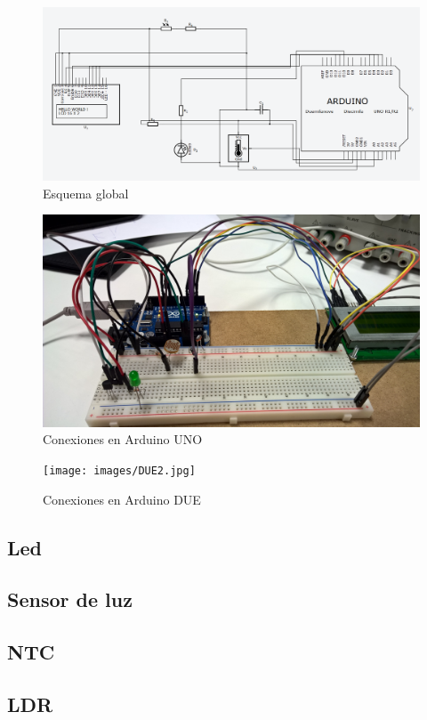 \documentclass[]{article}
\begin{document}
\begin{figure}[H]
	\centering
	\includegraphics[width=0.6\linewidth]{images/squema.PNG}
	\caption{Esquema global}
	\label{fig:squema}
\end{figure}


\begin{figure}[H]
	\centering
	\includegraphics[width=1\linewidth]{images/arduinoUNO.jpg}
	\caption{Conexiones en Arduino UNO}
	\label{fig:uno}
\end{figure}

\begin{figure}[H]
	\centering
	\texttt{[image: images/DUE2.jpg]}
	\caption{Conexiones en Arduino DUE}
	\label{fig:due}
\end{figure}

\subsection{Led}

\subsection{Sensor de luz}

\subsection{NTC}

\subsection{LDR}
\end{document}
